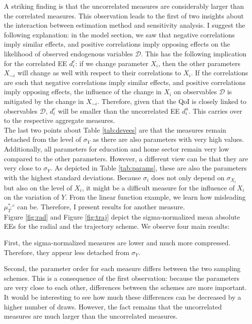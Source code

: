 \noindent
A striking finding is that the uncorrelated measures are considerably larger than the correlated measures. This observation leads to the first of two insights about the interaction between estimation method and sensitivity analysis. I suggest the following explanation: in the model section, we saw that negative correlations imply similar effects, and positive correlations imply opposing effects on the likelihood of observed endogenous variables $\pmb{\mathcal{D}}$. This has the following implication for the correlated EE $d_i^{c}$: if we change parameter $X_i$, then the other parameters $X_{\sim i}$ will change as well with respect to their correlations to $X_i$. If the correlations are such that negative correlations imply similar effects, and positive correlations imply opposing effects, the influence of the change in $X_i$ on observables $\pmb{\mathcal{D}}$ is mitigated by the change in $X_{\sim i}$. Therefore, given that the QoI is closely linked to observables $\pmb{\mathcal{D}}$, $d_i^{c}$ will be smaller than the uncorrelated EE $d_i^{u}$. This carries over to the respective aggregate measures.\\

\noindent
The last two points about Table \ref{tab:devees} are that the measures remain detached from the level of $\sigma_Y$ as there are also parameters with very high values. Additionally, all parameters for education and home sector remain very low compared to the other parameters. However, a different view can be that they are very close to $\sigma_Y$. As depicted in Table \ref{tab:params}, these are also the parameters with the highest standard deviations. Because $\sigma_i$ does not only depend on $\sigma_{X_i}$ but also on the level of $X_i$, it might be a difficult measure for the influence of $X_i$ on the variation of $Y$. From the linear function example, we learn how misleading $\mu^{*,c}_T$ can be. Therefore, I present results for another measure.\\


\noindent
Figure \ref{fig:rad} and Figure \ref{fig:traj} depict the sigma-normalized mean absolute EEs for the radial and the trajectory scheme. We observe four main results:


First, the sigma-normalized measures are lower and much more compressed. Therefore, they appear less detached from $\sigma_Y$.

Second, the parameter order for each measure differs between the two sampling schemes. This is a consequence of the first observation: because the parameters are very close to each other, differences between the schemes are more important. It would be interesting to see how much these differences can be decreased by a higher number of draws. However, the fact remains that the uncorrelated measures are much larger than the uncorrelated measures.

